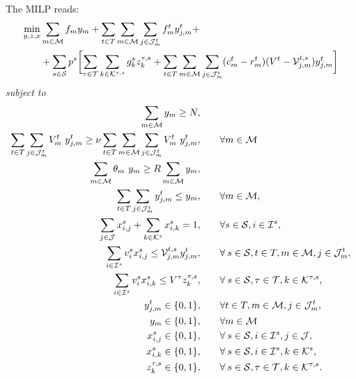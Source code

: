 \documentclass[a4paper,11pt]{article}
\begin{document}
	The MILP reads:
	\begin{equation}
		\begin{split}
			\min_{y,z,x} & \sum_{m \in \cal M} {f_{m}}y_{m} +  \sum_{t \in T} \sum_{m \in {{\cal M}}} \sum_{j \in {\cal J}_{m}^t} f_{m}^t y_{j,m}^t + \\
			& + \sum_{s \in \cal S} p^{s} \biggl [ \sum_{\tau \in \cal T} \sum_{k \in {\cal K}^{\tau,s}} g^{s}_k z_k^{\tau,s} + \sum_{t \in T} \sum_{m \in {\cal M}} \sum_{j \in {\cal J}^t_{m}} (c_{m}^t-r_{m}^t)(V^{t} - {\cal V}_{j,m}^{t,s}) y_{j,m}^t \biggr] \label{eq:dep:obj}
		\end{split}
	\end{equation}
	\textit{subject to}
	\begin{alignat}{2}
		\sum\limits_{m \in \cal {M}} y_{m}\geq{N}, & \qquad
		\label{eq:dep:3}\\
		\sum\limits_{t \in T} \sum\limits_{j \in {\cal J}^t_{m}} V_{m}^{t} \ y_{j,m}^{t} \geq \nu \sum\limits_{t \in T} \sum\limits_{m \in {\cal M}} \sum\limits_{j \in {\cal J}^t_{m}} V_{m}^{t} \ y^t_{j,m}, & \qquad \forall m \in {\cal M}
		\label{eq:dep:3.2}\\
		\sum\limits_{m \in {\cal M}} \theta_{m} \ y_{m} \geq R \sum\limits_{m \in {\cal M}} y_{m}, & \qquad \label{eq:dep:4}\\
		\sum\limits_{t \in T} \sum\limits_{j \in {\cal J}^t_{m}} y_{j,m}^{t} \leq y_{m}, & \qquad \forall m \in \cal M, \label{eq:dep:5}\\
		\sum\limits_{j \in \cal J}x_{i,j}^{s} + \sum\limits_{k \in {\cal K}^{s}}x_{i,k}^{s} = 1, & \qquad \forall s \in {\cal S}, i \in {\cal I}^{s}, \label{eq:dep:9}\\
		\sum\limits_{i \in {\cal I}^{s}}v_i^{s} x_{i,j}^{s} \leq {\cal V}_{j,m}^{t,s} y_{j,m}^t, & \qquad \forall \: s \in {\cal S}, t \in T, m\in{{\cal M}}, j \in {\cal J}^t_{m}, \label{eq:dep:10}\\
		\sum\limits_{i \in {\cal I}^{s}} v_i^{s} x_{i,k}^{s} \leq V^{\tau} z_k^{\tau,s}, & \qquad \forall \: s \in {\cal S}, \tau \in {\cal T}, k \in {\cal K}^{\tau,s}, \label{eq:dep:11}\\
		y_{j,m}^t \in \{0, 1\}, & \qquad \forall t \in T, m \in {\cal M}, j \in {\cal J}^t_{m}, \label{eq:dep:6}\\
		y_{m} \in \{0, 1\}, & \qquad \forall m \in \cal M \label{eq:dep:7}\\
		x_{i,j}^{s} \in \{0, 1\}, & \qquad \forall \: s \in {\cal S}, i \in {\cal I}^{s}, j \in {\cal J}, \label{eq:dep:12}\\
		x_{i,k}^{s} \in \{0, 1\}, & \qquad \forall \: s \in {\cal S}, i \in {\cal I}^{s}, k \in {\cal K}^{s}, \label{eq:dep:13}\\
		z_k^{\tau,s} \in \{0, 1\}, & \qquad \forall \: s \in {\cal S}, \tau \in {\cal T} , k \in {\cal K}^{\tau,s}. \label{eq:dep:14}
	\end{alignat}
\end{document}
